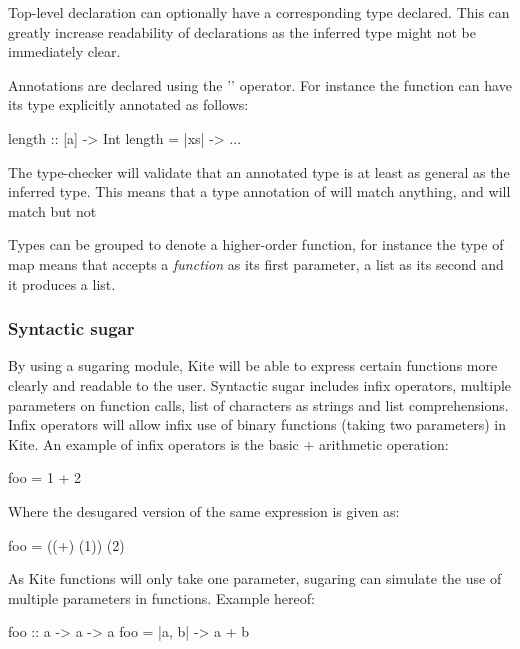 Top-level declaration can optionally have a corresponding type declared. This can greatly increase readability of declarations as the inferred type might not be immediately clear.

Annotations are declared using the '\code{::}' operator. For instance the function  can have its type explicitly annotated as follows:

\begin{kite}
length :: [a] -> Int
length = |xs| -> {
  ...
}
\end{kite}

The type-checker will validate that an annotated type is at least as general as the inferred type. This means that a type annotation of  will match anything, and  will match  but not 

Types can be grouped to denote a higher-order function, for instance the type of map  means that  accepts a \emph{function} as its first parameter, a list as its second and it produces a list.


\subsubsection{Syntactic sugar}
\label{sec:kite-design-sugar}
By using a sugaring module, Kite will be able to express certain functions more clearly and readable to the user. Syntactic sugar includes infix operators, multiple parameters on function calls, list of characters as strings and list comprehensions. Infix operators will allow infix use of binary functions (taking two parameters) in Kite. An example of infix operators is the basic $+$ arithmetic operation:

\begin{kite}
foo = 1 + 2
\end{kite}

Where the desugared version of the same expression is given as:

\begin{kite}
foo = ((+) (1)) (2)
\end{kite}

As Kite functions will only take one parameter, sugaring can simulate the use of multiple parameters in functions. Example hereof:

\begin{kite}
foo :: a -> a -> a
foo = |a, b| -> {
  a + b
}
\end{kite}

